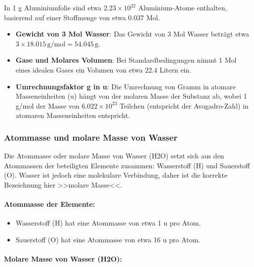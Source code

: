 \documentclass{vorlage-design-main}
\begin{document}
In 1 g Aluminiumfolie sind etwa $2.23 \times 10^{22}$ Aluminium-Atome
enthalten, basierend auf einer Stoffmenge von etwa 0.037 Mol.

\begin{itemize}

\item
  \textbf{Gewicht von 3 Mol Wasser}: Das Gewicht von 3 Mol Wasser
  beträgt etwa $3 \times 18.015 \, \text{g/mol} = 54.045 \, \text{g}$.
\item
  \textbf{Gase und Molares Volumen}: Bei Standardbedingungen nimmt 1 Mol
  eines idealen Gases ein Volumen von etwa 22.4 Litern ein.
\item
  \textbf{Umrechnungsfaktor g in u}: Die Umrechnung von Gramm in atomare
  Masseneinheiten (u) hängt von der molaren Masse der Substanz ab, wobei
  1 g/mol der Masse von $6.022 \times 10^{23}$ Teilchen (entspricht
  der Avogadro-Zahl) in atomaren Masseneinheiten entspricht.
\end{itemize}

\hypertarget{atommasse-und-molare-masse-von-wasser}{%
\subsubsection{Atommasse und molare Masse von
Wasser}\label{atommasse-und-molare-masse-von-wasser}}

Die Atommasse oder molare Masse von Wasser (H2O) setzt sich aus den
Atommassen der beteiligten Elemente zusammen: Wasserstoff (H) und
Sauerstoff (O). Wasser ist jedoch eine molekulare Verbindung, daher ist
die korrekte Bezeichnung hier >>molare Masse<<.

\hypertarget{atommasse-der-elemente}{%
\paragraph{Atommasse der Elemente:}\label{atommasse-der-elemente}}

\begin{itemize}

\item
  Wasserstoff (H) hat eine Atommasse von etwa 1 u pro Atom.
\item
  Sauerstoff (O) hat eine Atommasse von etwa 16 u pro Atom.
\end{itemize}

\hypertarget{molare-masse-von-wasser-h2o}{%
\paragraph{Molare Masse von Wasser
(H2O):}\label{molare-masse-von-wasser-h2o}}
\end{document}
